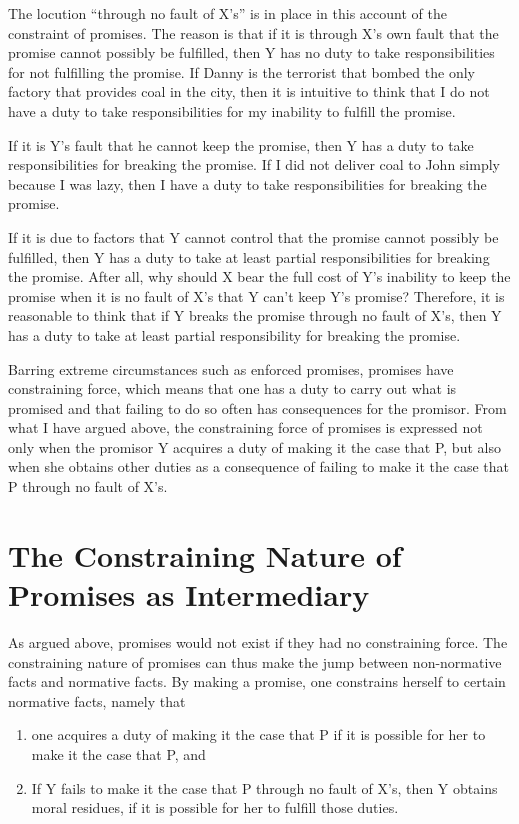 The locution ``through no fault of X's'' is in place in this account of
the constraint of promises. The reason is that if it is through X's own
fault that the promise cannot possibly be fulfilled, then Y has no duty
to take responsibilities for not fulfilling the promise. If Danny is the
terrorist that bombed the only factory that provides coal in the city,
then it is intuitive to think that I do not have a duty to take
responsibilities for my inability to fulfill the promise.

If it is Y's fault that he cannot keep the promise, then Y has a duty to
take responsibilities for breaking the promise. If I did not deliver
coal to John simply because I was lazy, then I have a duty to take
responsibilities for breaking the promise.

If it is due to factors that Y cannot control that the promise cannot
possibly be fulfilled, then Y has a duty to take at least partial
responsibilities for breaking the promise. After all, why should X bear
the full cost of Y's inability to keep the promise when it is no fault
of X's that Y can't keep Y's promise? Therefore, it is reasonable to
think that if Y breaks the promise through no fault of X's, then Y has a
duty to take at least partial responsibility for breaking the promise.

Barring extreme circumstances such as enforced promises, promises have
constraining force, which means that one has a duty to carry out what is
promised and that failing to do so often has consequences for the
promisor. From what I have argued above, the constraining force of
promises is expressed not only when the promisor Y acquires a duty of
making it the case that P, but also when she obtains other duties as a
consequence of failing to make it the case that P through no fault of
X's.

\section{The Constraining Nature of Promises as Intermediary}

As argued above, promises would not exist if they had no constraining
force. The constraining nature of promises can thus make the jump
between non-normative facts and normative facts. By making a promise,
one constrains herself to certain normative facts, namely that

\begin{displayquote} \def\labelenumi{(\arabic{enumi})}
	\itshape 
	\begin{enumerate}
		\item  one acquires a duty of making it the case that P if it is
possible for her to make it the case that P, and
		\item  If Y fails to make it the case that P through no fault of X's,
then Y obtains moral residues, if it is possible for her to fulfill
those duties.
	\end{enumerate}
\end{displayquote}

